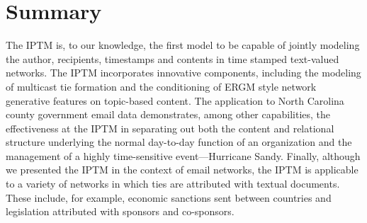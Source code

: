 \documentclass{article}
\begin{document}
\section{Summary}\label{sec:Conclusions}
The IPTM is, to our knowledge, the first model to be capable of jointly modeling the author, recipients, timestamps and contents in time stamped text-valued networks. The IPTM incorporates innovative components, including the modeling of multicast tie formation and the conditioning of ERGM style network generative features on topic-based content. The application to North Carolina county government email data demonstrates, among other capabilities, the effectiveness at the IPTM in separating out both the content and relational structure underlying the normal day-to-day function of an organization and the management of a highly time-sensitive event---Hurricane Sandy. Finally, although we presented the IPTM in the context of email networks, the IPTM is applicable to a variety of networks in which ties are attributed with textual documents. These include, for example, economic sanctions sent between countries and legislation attributed with sponsors and co-sponsors. 




\nocite{langley00}





\end{document}
